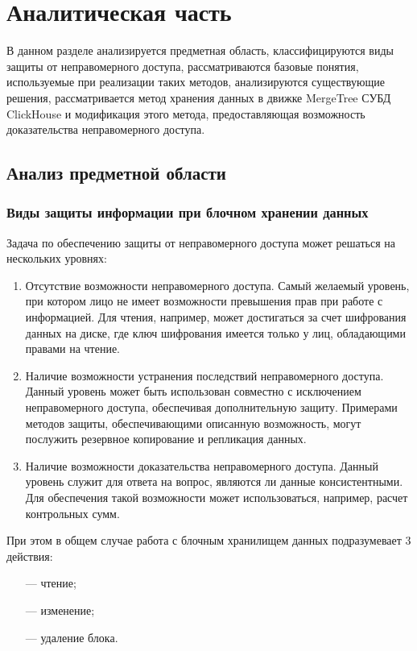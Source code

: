 \section{Аналитическая часть}

В данном разделе анализируется предметная область, классифицируются виды защиты от неправомерного доступа, рассматриваются базовые понятия, используемые при реализации таких методов, анализируются существующие решения, рассматривается метод хранения данных в движке MergeTree СУБД ClickHouse и модификация этого метода, предоставляющая возможность доказательства неправомерного доступа.

\subsection{Анализ предметной области}

\subsubsection{Виды защиты информации при блочном хранении данных}

Задача по обеспечению защиты от неправомерного доступа может решаться на нескольких уровнях:
\begin{enumerate}
	\item Отсутствие возможности неправомерного доступа. Самый желаемый уровень, при котором лицо не имеет возможности превышения прав при работе с информацией. Для чтения, например, может достигаться за счет шифрования данных на диске, где ключ шифрования имеется только у лиц, обладающими правами на чтение.
	\item Наличие возможности устранения последствий неправомерного доступа. Данный уровень может быть использован совместно с исключением неправомерного доступа, обеспечивая дополнительную защиту. Примерами методов защиты, обеспечивающими описанную возможность, могут послужить резервное копирование и репликация данных.
	\item Наличие возможности доказательства неправомерного доступа. Данный уровень служит для ответа на вопрос, являются ли данные консистентными. Для обеспечения такой возможности может использоваться, например, расчет контрольных сумм.
\end{enumerate}

При этом в общем случае работа с блочным хранилищем данных подразумевает 3 действия:
\begin{enumerate}
	\item [---] чтение;
    \item [---] изменение;
	\item [---] удаление блока.
\end{enumerate}

